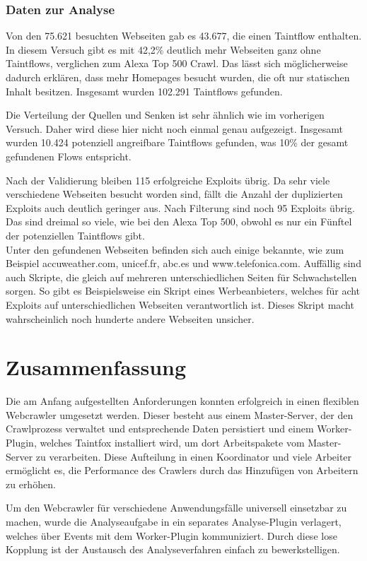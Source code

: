 \subsection{Daten zur Analyse}
Von den 75.621 besuchten Webseiten gab es 43.677, die einen Taintflow enthalten. In diesem Versuch gibt es mit  42,2\% deutlich mehr Webseiten ganz ohne Taintflows, verglichen zum Alexa Top 500 Crawl. Das lässt sich möglicherweise dadurch erklären, dass mehr Homepages besucht wurden, die oft nur statischen Inhalt besitzen. Insgesamt wurden 102.291 Taintflows gefunden.

Die Verteilung der Quellen und Senken ist sehr ähnlich wie im vorherigen Versuch. Daher wird diese hier nicht noch einmal genau aufgezeigt. Insgesamt wurden 10.424 potenziell angreifbare Taintflows gefunden, was 10\% der gesamt gefundenen Flows entspricht.

Nach der Validierung bleiben 115 erfolgreiche Exploits übrig. Da sehr viele verschiedene Webseiten besucht worden sind, fällt die Anzahl der duplizierten Exploits auch deutlich geringer aus. Nach Filterung sind noch 95 Exploits übrig. Das sind dreimal so viele, wie bei den Alexa Top 500, obwohl es nur ein Fünftel der potenziellen Taintflows gibt. \\
Unter den gefundenen Webseiten befinden sich auch einige bekannte, wie zum Beispiel accuweather.com, unicef.fr, abc.es und www.telefonica.com. Auffällig sind auch Skripte, die gleich auf mehreren unterschiedlichen Seiten für Schwachstellen sorgen. So gibt es Beispielsweise ein Skript eines Werbeanbieters, welches für acht Exploits auf unterschiedlichen Webseiten verantwortlich ist. Dieses Skript macht wahrscheinlich noch hunderte andere Webseiten unsicher.

\chapter{Zusammenfassung}
Die am Anfang aufgestellten Anforderungen konnten erfolgreich in einen flexiblen Webcrawler umgesetzt werden. Dieser besteht aus einem Master-Server, der den Crawlprozess verwaltet und entsprechende Daten persistiert und einem Worker-Plugin, welches Taintfox installiert wird, um dort Arbeitspakete vom Master-Server zu verarbeiten. Diese Aufteilung in einen Koordinator und viele Arbeiter ermöglicht es, die Performance des Crawlers durch das Hinzufügen von Arbeitern zu erhöhen. 

Um den Webcrawler für verschiedene Anwendungsfälle universell einsetzbar zu machen, wurde die Analyseaufgabe in ein separates Analyse-Plugin verlagert, welches über Events mit dem Worker-Plugin kommuniziert. Durch diese lose Kopplung ist der Austausch des Analyseverfahren einfach zu bewerkstelligen.

